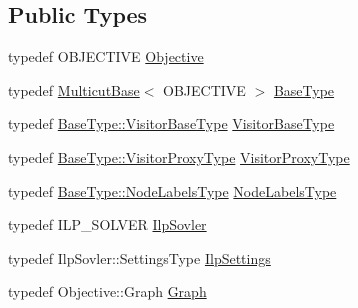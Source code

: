 \subsection*{Public Types}
\begin{DoxyCompactItemize}
\item 
typedef O\+B\+J\+E\+C\+T\+I\+V\+E \hyperlink{classnifty_1_1graph_1_1optimization_1_1multicut_1_1MulticutIlp_a1c9fe5899608fc9c8e32bde6648c8278}{Objective}
\item 
typedef \hyperlink{classnifty_1_1graph_1_1optimization_1_1multicut_1_1MulticutBase}{Multicut\+Base}$<$ O\+B\+J\+E\+C\+T\+I\+V\+E $>$ \hyperlink{classnifty_1_1graph_1_1optimization_1_1multicut_1_1MulticutIlp_ae9fe1c9a4007075298a7a39fca4f2a63}{Base\+Type}
\item 
typedef \hyperlink{classnifty_1_1graph_1_1optimization_1_1common_1_1SolverBase_a5a14d64c70a9cc0eebc7d71d2b089f9b}{Base\+Type\+::\+Visitor\+Base\+Type} \hyperlink{classnifty_1_1graph_1_1optimization_1_1multicut_1_1MulticutIlp_a9eefe7c387f863ed499bb53854164d9a}{Visitor\+Base\+Type}
\item 
typedef \hyperlink{classnifty_1_1graph_1_1optimization_1_1common_1_1SolverBase_a58913ea9ab9232ff72608b710c1012d0}{Base\+Type\+::\+Visitor\+Proxy\+Type} \hyperlink{classnifty_1_1graph_1_1optimization_1_1multicut_1_1MulticutIlp_ad770feadea053ce14d19fb0db774867b}{Visitor\+Proxy\+Type}
\item 
typedef \hyperlink{classnifty_1_1graph_1_1optimization_1_1common_1_1SolverBase_a6e4e465f3b6e039882669fcfb9714818}{Base\+Type\+::\+Node\+Labels\+Type} \hyperlink{classnifty_1_1graph_1_1optimization_1_1multicut_1_1MulticutIlp_acc09a2ea6cee89d05a3edf7f6681431c}{Node\+Labels\+Type}
\item 
typedef I\+L\+P\+\_\+\+S\+O\+L\+V\+E\+R \hyperlink{classnifty_1_1graph_1_1optimization_1_1multicut_1_1MulticutIlp_ac85f089fd12431bd80f33c83dd45bdc7}{Ilp\+Sovler}
\item 
typedef Ilp\+Sovler\+::\+Settings\+Type \hyperlink{classnifty_1_1graph_1_1optimization_1_1multicut_1_1MulticutIlp_a80c305a79499dcbf64972c3da063425d}{Ilp\+Settings}
\item 
typedef Objective\+::\+Graph \hyperlink{classnifty_1_1graph_1_1optimization_1_1multicut_1_1MulticutIlp_a98f6b00c67ccecf9e2c5ad63d8d2bade}{Graph}
\end{DoxyCompactItemize}
